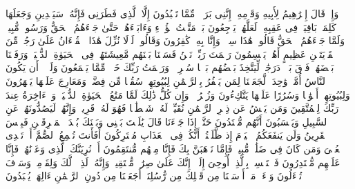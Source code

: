 \startbuffer[\q:43:26]
وَإِذۡ قَالَ إِبۡرَٰهِیمُ لِأَبِیهِ وَقَوۡمِهِۦۤ إِنَّنِی بَرَاۤءࣱ مِّمَّا تَعۡبُدُونَ%
\stopbuffer
\startbuffer[\q:43:27]
إِلَّا ٱلَّذِی فَطَرَنِی فَإِنَّهُۥ سَیَهۡدِینِ%
\stopbuffer
\startbuffer[\q:43:28]
وَجَعَلَهَا كَلِمَةَۢ بَاقِیَةࣰ فِی عَقِبِهِۦ لَعَلَّهُمۡ یَرۡجِعُونَ%
\stopbuffer
\startbuffer[\q:43:29]
بَلۡ مَتَّعۡتُ هَٰۤؤُلَاۤءِ وَءَابَاۤءَهُمۡ حَتَّىٰ جَاۤءَهُمُ ٱلۡحَقُّ وَرَسُولࣱ مُّبِینࣱ%
\stopbuffer
\startbuffer[\q:43:30]
وَلَمَّا جَاۤءَهُمُ ٱلۡحَقُّ قَالُوا۟ هَٰذَا سِحۡرࣱ وَإِنَّا بِهِۦ كَٰفِرُونَ%
\stopbuffer
\startbuffer[\q:43:31]
وَقَالُوا۟ لَوۡلَا نُزِّلَ هَٰذَا ٱلۡقُرۡءَانُ عَلَىٰ رَجُلࣲ مِّنَ ٱلۡقَرۡیَتَیۡنِ عَظِیمٍ%
\stopbuffer
\startbuffer[\q:43:32]
أَهُمۡ یَقۡسِمُونَ رَحۡمَتَ رَبِّكَۚ نَحۡنُ قَسَمۡنَا بَیۡنَهُم مَّعِیشَتَهُمۡ فِی ٱلۡحَیَوٰةِ ٱلدُّنۡیَاۚ وَرَفَعۡنَا بَعۡضَهُمۡ فَوۡقَ بَعۡضࣲ دَرَجَٰتࣲ لِّیَتَّخِذَ بَعۡضُهُم بَعۡضࣰا سُخۡرِیࣰّاۗ وَرَحۡمَتُ رَبِّكَ خَیۡرࣱ مِّمَّا یَجۡمَعُونَ%
\stopbuffer
\startbuffer[\q:43:33]
وَلَوۡلَاۤ أَن یَكُونَ ٱلنَّاسُ أُمَّةࣰ وَٰحِدَةࣰ لَّجَعَلۡنَا لِمَن یَكۡفُرُ بِٱلرَّحۡمَٰنِ لِبُیُوتِهِمۡ سُقُفࣰا مِّن فِضَّةࣲ وَمَعَارِجَ عَلَیۡهَا یَظۡهَرُونَ%
\stopbuffer
\startbuffer[\q:43:34]
وَلِبُیُوتِهِمۡ أَبۡوَٰبࣰا وَسُرُرًا عَلَیۡهَا یَتَّكِءُونَ%
\stopbuffer
\startbuffer[\q:43:35]
وَزُخۡرُفࣰاۚ وَإِن كُلُّ ذَٰلِكَ لَمَّا مَتَٰعُ ٱلۡحَیَوٰةِ ٱلدُّنۡیَاۚ وَٱلۡءَاخِرَةُ عِندَ رَبِّكَ لِلۡمُتَّقِینَ%
\stopbuffer
\startbuffer[\q:43:36]
وَمَن یَعۡشُ عَن ذِكۡرِ ٱلرَّحۡمَٰنِ نُقَیِّضۡ لَهُۥ شَیۡطَٰنࣰا فَهُوَ لَهُۥ قَرِینࣱ%
\stopbuffer
\startbuffer[\q:43:37]
وَإِنَّهُمۡ لَیَصُدُّونَهُمۡ عَنِ ٱلسَّبِیلِ وَیَحۡسَبُونَ أَنَّهُم مُّهۡتَدُونَ%
\stopbuffer
\startbuffer[\q:43:38]
حَتَّىٰۤ إِذَا جَاۤءَنَا قَالَ یَٰلَیۡتَ بَیۡنِی وَبَیۡنَكَ بُعۡدَ ٱلۡمَشۡرِقَیۡنِ فَبِئۡسَ ٱلۡقَرِینُ%
\stopbuffer
\startbuffer[\q:43:39]
وَلَن یَنفَعَكُمُ ٱلۡیَوۡمَ إِذ ظَّلَمۡتُمۡ أَنَّكُمۡ فِی ٱلۡعَذَابِ مُشۡتَرِكُونَ%
\stopbuffer
\startbuffer[\q:43:40]
أَفَأَنتَ تُسۡمِعُ ٱلصُّمَّ أَوۡ تَهۡدِی ٱلۡعُمۡیَ وَمَن كَانَ فِی ضَلَٰلࣲ مُّبِینࣲ%
\stopbuffer
\startbuffer[\q:43:41]
فَإِمَّا نَذۡهَبَنَّ بِكَ فَإِنَّا مِنۡهُم مُّنتَقِمُونَ%
\stopbuffer
\startbuffer[\q:43:42]
أَوۡ نُرِیَنَّكَ ٱلَّذِی وَعَدۡنَٰهُمۡ فَإِنَّا عَلَیۡهِم مُّقۡتَدِرُونَ%
\stopbuffer
\startbuffer[\q:43:43]
فَٱسۡتَمۡسِكۡ بِٱلَّذِیۤ أُوحِیَ إِلَیۡكَۖ إِنَّكَ عَلَىٰ صِرَٰطࣲ مُّسۡتَقِیمࣲ%
\stopbuffer
\startbuffer[\q:43:44]
وَإِنَّهُۥ لَذِكۡرࣱ لَّكَ وَلِقَوۡمِكَۖ وَسَوۡفَ تُسۡءَلُونَ%
\stopbuffer
\startbuffer[\q:43:45]
وَسۡءَلۡ مَنۡ أَرۡسَلۡنَا مِن قَبۡلِكَ مِن رُّسُلِنَاۤ أَجَعَلۡنَا مِن دُونِ ٱلرَّحۡمَٰنِ ءَالِهَةࣰ یُعۡبَدُونَ%
\stopbuffer
\startbuffer[\q:43:46]
